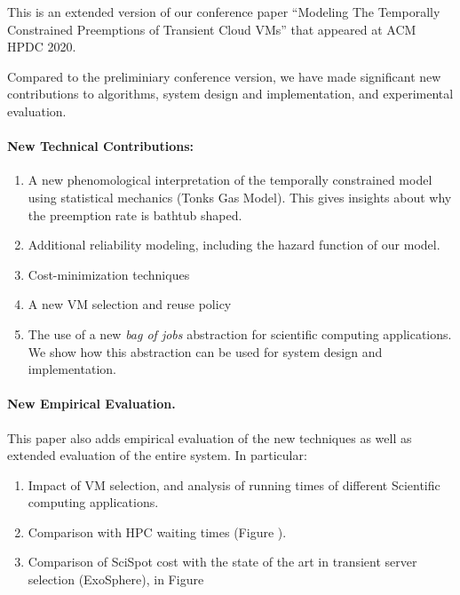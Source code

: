 \documentclass{article}
\begin{document}
This is an extended version of our conference paper ``Modeling The Temporally Constrained Preemptions of Transient Cloud VMs'' that appeared at ACM HPDC 2020. 

Compared to the preliminiary conference version, we have made significant new contributions to algorithms, system design and implementation, and experimental evaluation. 




\paragraph{New Technical Contributions:}

\begin{enumerate}
\item A new phenomological interpretation of the temporally constrained model using statistical mechanics (Tonks Gas Model). This gives insights about why the preemption rate is bathtub shaped. 

\item Additional reliability modeling, including the hazard function of our model. 

\item Cost-minimization techniques 

\item A new VM selection and reuse policy 

\item The use of a new \emph{bag of jobs} abstraction for scientific computing applications. We show how this abstraction can be used for system design and implementation.

\end{enumerate}

\paragraph{New Empirical Evaluation.}
This paper also adds empirical evaluation of the new techniques as well as extended evaluation of the entire system. In particular:

\begin{enumerate}
\item Impact of VM selection, and analysis of running times of different Scientific computing applications. 
\item Comparison with HPC waiting times (Figure ). 
\item Comparison of SciSpot cost with the state of the art in transient server selection (ExoSphere), in Figure 
\end{enumerate}
\end{document}
